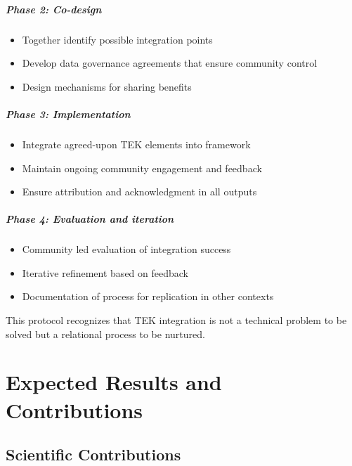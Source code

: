 \documentclass[12pt,oneside]{book}
\begin{document}
\paragraph{Phase 2: Co-design}
\begin{itemize}
    \item Together identify possible integration points
    \item Develop data governance agreements that ensure community control
    \item Design mechanisms for sharing benefits
\end{itemize}

\paragraph{Phase 3: Implementation}
\begin{itemize}
    \item Integrate agreed-upon TEK elements into framework
    \item Maintain ongoing community engagement and feedback
    \item Ensure attribution and acknowledgment in all outputs
\end{itemize}

\paragraph{Phase 4: Evaluation and iteration}
\begin{itemize}
    \item Community led evaluation of integration success
    \item Iterative refinement based on feedback
    \item Documentation of process for replication in other contexts
\end{itemize}

This protocol recognizes that TEK integration is not a technical problem to be solved but a relational process to be nurtured.


\chapter{Expected Results and Contributions}
\label{ch:contributions}

\section{Scientific Contributions}
\label{sec:scientific-contributions}
\end{document}

